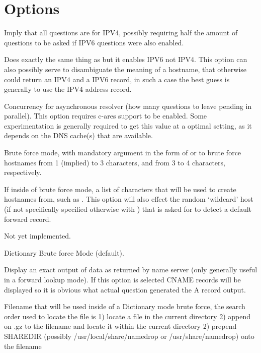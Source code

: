 \documentclass[english]{article}
\begin{document}
\section{Options}
\begin{Description}
\item[\Opt{-4}]
Imply that all questions are for IPV4, possibly requiring half the amount of questions
to be asked if IPV6 questions were also enabled.
\item[\Opt{-6}]
Does exactly the same thing as  but it enables IPV6 not IPV4. This option can
also possibly serve to disambiguate the meaning of a hostname, that otherwise could return an IPV4
and a IPV6 record, in such a case the best guess is generally to use the IPV4 address record.
\item[\OptArg{-a}{ number}]
Concurrency for asynchronous resolver (how many questions to leave pending in parallel). This option
requires c-ares support to be enabled. Some experimentation is generally required to get this value at
a optimal setting, as it depends on the DNS cache(s) that are available.
\item[\OptArg{-b}{ number-number}]
Brute force mode, with mandatory argument in the form of  or  to brute force
hostnames from 1 (implied) to 3 characters, and from 3 to 4 characters, respectively.
\item[\OptArg{-c}{ characters}]
If inside of brute force mode, a list of characters that will be used to create hostnames from, such as
. This option will also effect the random `wildcard' host
(if not specifically specified otherwise with ) that is asked for to detect a default forward
record.
\item[\Opt{-d}]
Not yet implemented.
\item[\Opt{-D}]
Dictionary Brute force Mode (default).
\item[\Opt{-e}]
Display an exact output of data as returned by name server (only generally useful in a forward lookup mode).
If this option is selected CNAME records will be displayed so it is obvious what actual question generated
the A record output.
\item[\OptArg{-f}{ filename}]
Filename that will be used inside of a Dictionary mode brute force, the search order used to locate the file
is 1) locate a file in the current directory 2) append on .gz to the filename and locate it within the current
directory 2) prepend SHAREDIR (possibly /usr/local/share/namedrop or /usr/share/namedrop) onto the filename

\end{Description}
\end{document}
